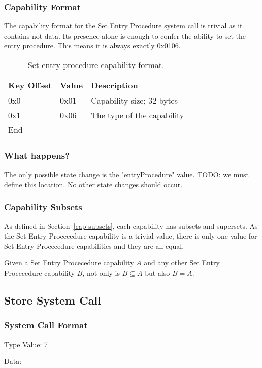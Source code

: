 \documentclass[english,a4paper]{article}
\let\oldparagraph\subsubsection
\renewcommand{\subsubsection}[1]{\oldparagraph{#1}\mbox{}}
\begin{document}
\subsubsection{Capability Format}
The capability format for the Set Entry Procedure system call is trivial as it
contains not data. Its presence alone is enough to confer the ability to set the
entry procedure. This means it is always exactly 0x0106.

\begin{table}[H]
  \caption{Set entry procedure capability format.}
  \centering{}%
  \begin{tabular}{l|l|p{}}
    \hline
    Key Offset & Value & Description\tabularnewline
    \hline
    \hline
    0x0 & 0x01 & Capability size; 32 bytes \tabularnewline
    0x1 & 0x06 & The type of the capability \tabularnewline
    \hline
    End &  \tabularnewline
    \hline
  \end{tabular}
\end{table}

\subsubsection{What happens?}
The only possible state change is the "entryProcedure" value. TODO: we must
define this location. No other state changes should occur.

\subsubsection{Capability Subsets}
As defined in Section~\ref{cap-subsets}, each capability has subsets and
supersets. As the Set Entry Procecedure capability is a trivial value, there is
only one value for Set Entry Procecedure capabilities and they are all equal.

Given a Set Entry Procecedure capability $A$ and any other Set Entry Procecedure
capability $B$, not only is $B \subseteq A$ but also $B = A$.

\subsection{Store System Call}

\subsubsection{System Call Format}
Type Value: 7

Data:
\end{document}
